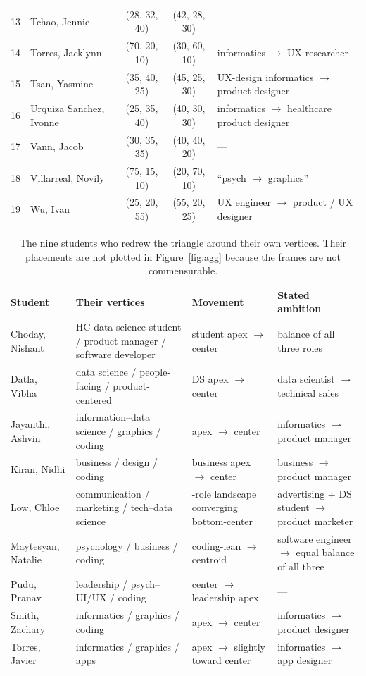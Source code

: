 \documentclass[11pt]{article}
\begin{document}
\begin{table}[htbp]
\begin{tabularx}{\textwidth}{@{}r l c c >{\RaggedRight\arraybackslash}X@{}}
13 & Tchao, Jennie & (28, 32, 40) & (42, 28, 30) & --- \\
14 & Torres, Jacklynn & (70, 20, 10) & (30, 60, 10) & informatics $\to$ UX researcher \\
15 & Tsan, Yasmine & (35, 40, 25) & (45, 25, 30) & UX-design informatics $\to$ product designer \\
16 & Urquiza Sanchez, Ivonne & (25, 35, 40) & (40, 30, 30) & informatics $\to$ healthcare product designer \\
17 & Vann, Jacob & (30, 35, 35) & (40, 40, 20) & --- \\
18 & Villarreal, Novily & (75, 15, 10) & (20, 70, 10) & ``psych $\to$ graphics'' \\
19 & Wu, Ivan & (25, 20, 55) & (55, 20, 25) & UX engineer $\to$ product / UX designer \\
\bottomrule
\end{tabularx}
\end{table}

\begin{table}[htbp]
\centering\small
\caption{The nine students who redrew the triangle around their own vertices.
Their placements are not plotted in Figure~\ref{fig:agg} because the frames are
not commensurable.}
\label{tab:reframed}
\begin{tabularx}{\textwidth}{@{}l >{\RaggedRight\arraybackslash}X >{\RaggedRight\arraybackslash}X >{\RaggedRight\arraybackslash}X@{}}
\toprule
Student & Their vertices & Movement & Stated ambition \\
\midrule
Choday, Nishant & HC data-science student / product manager / software developer & student apex $\to$ center & balance of all three roles \\
Datla, Vibha & data science / people-facing / product-centered & DS apex $\to$ center & data scientist $\to$ technical sales \\
Jayanthi, Ashvin & information--data science / graphics / coding & apex $\to$ center & informatics $\to$ product manager \\
Kiran, Nidhi & business / design / coding & business apex $\to$ center & business $\to$ product manager \\
Low, Chloe & communication / marketing / tech--data science & 7-role landscape converging bottom-center & advertising + DS student $\to$ product marketer \\
Maytesyan, Natalie & psychology / business / coding & coding-lean $\to$ centroid & software engineer $\to$ equal balance of all three \\
Pudu, Pranav & leadership / psych--UI/UX / coding & center $\to$ leadership apex & --- \\
Smith, Zachary & informatics / graphics / coding & apex $\to$ center & informatics $\to$ product designer \\
Torres, Javier & informatics / graphics / apps & apex $\to$ slightly toward center & informatics $\to$ app designer \\
\bottomrule
\end{tabularx}
\end{table}
\end{document}
